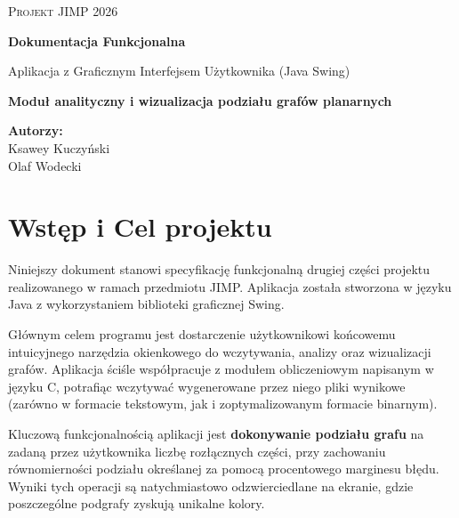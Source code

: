 \documentclass[12pt,a4paper]{article}
\begin{document}
\begin{titlepage}
    \centering
    \vspace*{3cm}
    
    {\scshape\LARGE Projekt JIMP 2026 \par}
    \vspace{1.5cm}
    {\huge\bfseries Dokumentacja Funkcjonalna\par}
    \vspace{0.5cm}
    {\Large Aplikacja z Graficznym Interfejsem Użytkownika (Java Swing) \par}
    
    \vspace{2cm}
    \textbf{Moduł analityczny i wizualizacja podziału grafów planarnych}
    
    \vfill
    
    \begin{flushright}
        \large
        \textbf{Autorzy:}\\
        Ksawey Kuczyński\\
        Olaf Wodecki
    \end{flushright}
    

\end{titlepage}

\newpage
\tableofcontents
\newpage

\section{Wstęp i Cel projektu}
Niniejszy dokument stanowi specyfikację funkcjonalną drugiej części projektu realizowanego w ramach przedmiotu JIMP. Aplikacja została stworzona w języku Java z wykorzystaniem biblioteki graficznej Swing. 

Głównym celem programu jest dostarczenie użytkownikowi końcowemu intuicyjnego narzędzia okienkowego do wczytywania, analizy oraz wizualizacji grafów. Aplikacja ściśle współpracuje z modułem obliczeniowym napisanym w języku C, potrafiąc wczytywać wygenerowane przez niego pliki wynikowe (zarówno w formacie tekstowym, jak i zoptymalizowanym formacie binarnym).

Kluczową funkcjonalnością aplikacji jest \textbf{dokonywanie podziału grafu} na zadaną przez użytkownika liczbę rozłącznych części, przy zachowaniu równomierności podziału określanej za pomocą procentowego marginesu błędu. Wyniki tych operacji są natychmiastowo odzwierciedlane na ekranie, gdzie poszczególne podgrafy zyskują unikalne kolory.
\end{document}

